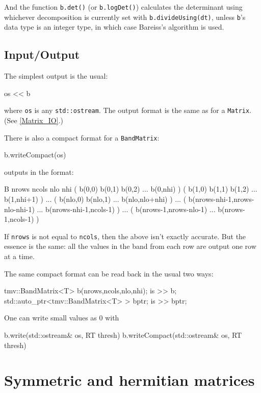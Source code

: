 \documentclass[twoside,letterpaper,11pt]{article}
\renewcommand{\tt}[1]{{\lstinline {#1}}}
\begin{document}
And the function \tt{b.det()} (or \tt{b.logDet()}) calculates the determinant
using whichever decomposition is currently set with \tt{b.divideUsing(dt)},
unless \tt{b}'s data type is an integer type, in which case Bareiss's algorithm 
is used.

\subsection{Input/Output}
\label{BandMatrix_IO}

The simplest output is the usual:
\begin{tmvcode}
os << b
\end{tmvcode}
where \tt{os} is any \tt{std::ostream}.
The output format is the same as for a \tt{Matrix}.
(See \ref{Matrix_IO}.)

There is also a compact format for a \tt{BandMatrix}:
\begin{tmvcode}
b.writeCompact(os)
\end{tmvcode}
outputs in the format:
\begin{tmvcode}
B nrows ncols nlo nhi
( b(0,0)  b(0,1)  b(0,2) ... b(0,nhi) )
( b(1,0)  b(1,1)  b(1,2) ... b(1,nhi+1) )
...
( b(nlo,0)  b(nlo,1) ...  b(nlo,nlo+nhi) )
...
( b(nrows-nhi-1,nrows-nlo-nhi-1) ... b(nrows-nhi-1,ncols-1) )
...
( b(nrows-1,nrows-nlo-1)  ... b(nrows-1,ncols-1) )
\end{tmvcode}
If \tt{nrows} is not equal to \tt{ncols}, then the above isn't exactly accurate.  But the
essence is the same: all the values in the band from each row are output one row at a time.

The same compact format can be read back in the usual two ways:
\begin{tmvcode}
tmv::BandMatrix<T> b(nrows,ncols,nlo,nhi);
is >> b;
std::auto_ptr<tmv::BandMatrix<T> > bptr;
is >> bptr;
\end{tmvcode}

One can write small values as 0 with
\begin{tmvcode}
b.write(std::ostream& os, RT thresh)
b.writeCompact(std::ostream& os, RT thresh)
\end{tmvcode}

\newpage
\section{Symmetric and hermitian matrices}
\label{SymMatrix}
\end{document}
